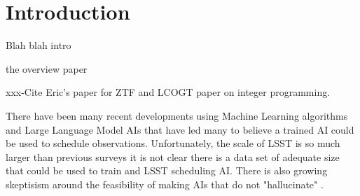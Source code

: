 \documentclass[]{aastex631}
\begin{document}


\section{Introduction} \label{sec:intro}
Blah blah intro

the overview paper \citet{Rubin_overview2019}

xxx-Cite Eric's paper for ZTF \citep{Bellm2019} and LCOGT paper \citep{Lampoudi2015} on integer programming.

There have been many recent developments using Machine Learning algorithms and Large Language Model AIs that have led many to believe a trained AI could be used to schedule observations. Unfortunately, the scale of LSST is so much larger than previous surveys it is not clear there is a data set of adequate size that could be used to train and LSST scheduling AI. There is also growing skeptisism around the feasibility of making AIs that do not "hallucinate" \citep{Hicks24}.
\end{document}
